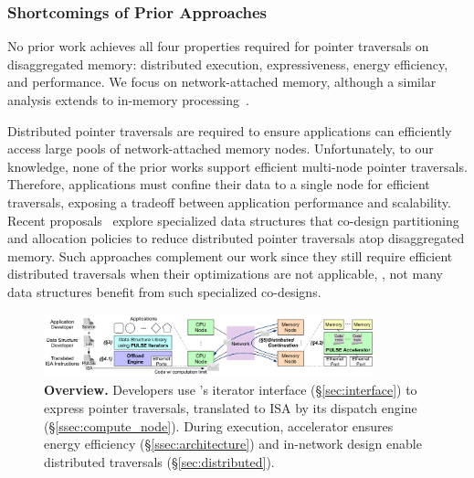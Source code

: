 \subsubsection{Shortcomings of Prior Approaches}
\label{ssec:prior}



No prior work achieves all four properties required for pointer traversals on disaggregated memory: distributed execution, expressiveness, energy efficiency, and performance. We focus on network-attached memory, although a similar analysis extends to in-memory processing~\cite{walkers, ahn2015scalable, impica, asghari2016chameleon, chi2016prime, seshadri2017simple, dai2018graphh, schuiki2018scalable, mutlu2019processing, kwon2019_TensorDIMM, boroumand2019_codna, gu2020ipim, lockerman2020livia, cho2020_data, ke2020_RecNMP, wang2021stream, xie2021spacea, ke2021near, singh2021fpga, olgun2022pidram, mutlu2022modern, oliveira2022accelerating, eckert2022eidetic, tu2022redcim, dai2022dimmining, devic2022_PIM, wang2022_Nearstream, gomez2023evaluating, xie2023mpu}.
 

 Distributed pointer traversals are required to ensure applications can efficiently access large pools of network-attached memory nodes. Unfortunately, to our knowledge, none of the prior works support efficient multi-node pointer traversals. Therefore, applications must confine their data to a single node for efficient traversals, exposing a tradeoff between application performance and scalability. Recent proposals~\cite{sherman, clover, fusee, rolex, marlin, sephash, ditto} explore specialized data structures that co-design partitioning and allocation policies to reduce distributed pointer traversals atop disaggregated memory. Such approaches complement our work since they still require efficient distributed traversals when their optimizations are not applicable, \eg, not many data structures benefit from such specialized co-designs. 

\begin{figure}[ht!]
  \centering
  \includegraphics[width=0.85\textwidth]{fig/pulse/overview.pdf}
  \vspace{-1em}
  \caption{\textbf{\name Overview.} Developers use \name's iterator interface (\S\ref{sec:interface}) to express pointer traversals, translated to \name ISA by its dispatch engine (\S\ref{ssec:compute_node}). During execution, \name accelerator ensures energy efficiency (\S\ref{ssec:architecture}) and in-network design enable distributed traversals (\S\ref{sec:distributed}).} 
  \label{fig:general}\vspace{-1em}
\end{figure}

